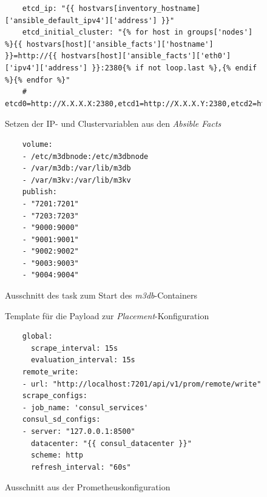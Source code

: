 \documentclass[11pt,a4paper]{article}
\begin{document}
\begin{figure}[!htbp]
  \begin{lstlisting}
    etcd_ip: "{{ hostvars[inventory_hostname]['ansible_default_ipv4']['address'] }}"
    etcd_initial_cluster: "{% for host in groups['nodes'] %}{{ hostvars[host]['ansible_facts']['hostname'] }}=http://{{ hostvars[host]['ansible_facts']['eth0']['ipv4']['address'] }}:2380{% if not loop.last %},{% endif %}{% endfor %}"
    # etcd0=http://X.X.X.X:2380,etcd1=http://X.X.X.Y:2380,etcd2=http://X.X.X.Z:2380
  \end{lstlisting}
  \caption{Setzen der IP- und Clustervariablen aus den \emph{Absible Facts}}
  \label{figure:etcd-var}
\end{figure}

\begin{figure}[!htbp]
  \begin{lstlisting}
    volume:
    - /etc/m3dbnode:/etc/m3dbnode
    - /var/m3db:/var/lib/m3db
    - /var/m3kv:/var/lib/m3kv
    publish:
    - "7201:7201"
    - "7203:7203"
    - "9000:9000"
    - "9001:9001"
    - "9002:9002"
    - "9003:9003"
    - "9004:9004"
  \end{lstlisting}
  \caption{Ausschnitt des \gls{task} zum Start des \emph{m3db}-Containers}
  \label{figure:m3db-ports}
\end{figure}

\begin{figure}[!htbp]
  
  \caption{Template für die Payload zur \emph{Placement}-Konfiguration}
  \label{figure:m3db-placing}
\end{figure}

\begin{figure}[!htbp]
  \begin{lstlisting}
    global:
      scrape_interval: 15s
      evaluation_interval: 15s
    remote_write:
    - url: "http://localhost:7201/api/v1/prom/remote/write"
    scrape_configs:
    - job_name: 'consul_services'
    consul_sd_configs:
    - server: "127.0.0.1:8500"
      datacenter: "{{ consul_datacenter }}"
      scheme: http
      refresh_interval: "60s"
  \end{lstlisting}
  \caption{Ausschnitt aus der Prometheuskonfiguration}
  \label{figure:prometheus-conf}
\end{figure}

\newpage
\end{document}

